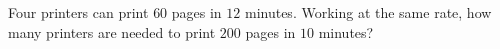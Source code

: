 Four printers can print $60$ pages in $12$ minutes. Working at the same rate, how many printers are needed to print $200$ pages in $10$ minutes?
